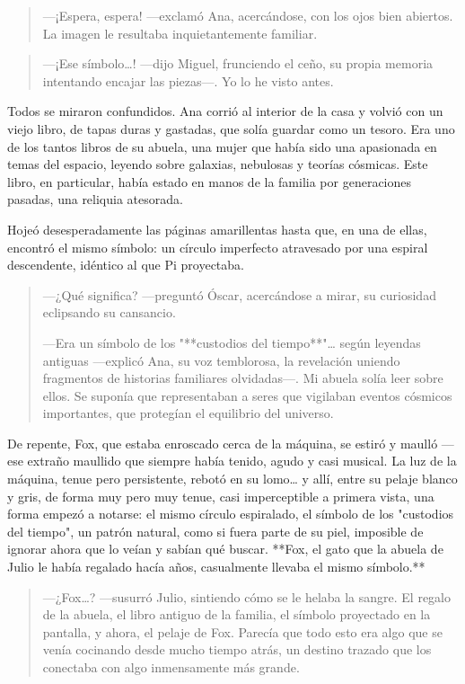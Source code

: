 \documentclass[a4paper,12pt]{book}
\begin{document}
\begin{quote}
    —¡Espera, espera! —exclamó Ana, acercándose, con los ojos bien abiertos. La imagen le resultaba inquietantemente familiar.
\end{quote}

\begin{quote}
    —¡Ese símbolo…! —dijo Miguel, frunciendo el ceño, su propia memoria intentando encajar las piezas—. Yo lo he visto antes.
\end{quote}

Todos se miraron confundidos. Ana corrió al interior de la casa y volvió con un viejo libro, de tapas duras y gastadas, que solía guardar como un tesoro. Era uno de los tantos libros de su abuela, una mujer que había sido una apasionada en temas del espacio, leyendo sobre galaxias, nebulosas y teorías cósmicas. Este libro, en particular, había estado en manos de la familia por generaciones pasadas, una reliquia atesorada.

Hojeó desesperadamente las páginas amarillentas hasta que, en una de ellas, encontró el mismo símbolo: un círculo imperfecto atravesado por una espiral descendente, idéntico al que Pi proyectaba.

\begin{quote}
    —¿Qué significa? —preguntó Óscar, acercándose a mirar, su curiosidad eclipsando su cansancio.

    —Era un símbolo de los "**custodios del tiempo**"… según leyendas antiguas —explicó Ana, su voz temblorosa, la revelación uniendo fragmentos de historias familiares olvidadas—. Mi abuela solía leer sobre ellos. Se suponía que representaban a seres que vigilaban eventos cósmicos importantes, que protegían el equilibrio del universo.
\end{quote}

De repente, Fox, que estaba enroscado cerca de la máquina, se estiró y maulló —ese extraño maullido que siempre había tenido, agudo y casi musical. La luz de la máquina, tenue pero persistente, rebotó en su lomo… y allí, entre su pelaje blanco y gris, de forma muy pero muy tenue, casi imperceptible a primera vista, una forma empezó a notarse: el mismo círculo espiralado, el símbolo de los "custodios del tiempo", un patrón natural, como si fuera parte de su piel, imposible de ignorar ahora que lo veían y sabían qué buscar. **Fox, el gato que la abuela de Julio le había regalado hacía años, casualmente llevaba el mismo símbolo.**

\begin{quote}
    —¿Fox…? —susurró Julio, sintiendo cómo se le helaba la sangre. El regalo de la abuela, el libro antiguo de la familia, el símbolo proyectado en la pantalla, y ahora, el pelaje de Fox. Parecía que todo esto era algo que se venía cocinando desde mucho tiempo atrás, un destino trazado que los conectaba con algo inmensamente más grande.
\end{quote}
\end{document}
